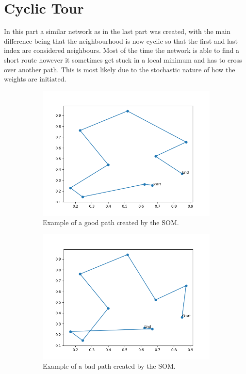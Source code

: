 \documentclass{article}
\begin{document}
\section{Cyclic Tour}
In this part  a similar network as in the last part was created, with the main difference being that the neighbourhood is now cyclic so that the first and last index are considered neighbours. Most of the time the network is able to find a short route however it sometimes get stuck in a local minimum and has to cross over another path. This is most likely due to the stochastic nature of how the weights are initiated.

\begin{figure}[ht!]
    \centering
    \begin{subfigure}[t]{0.4\textwidth}
        \centering
        \includegraphics[width=1\textwidth]{plots/assignment_2/cities_good_solution_20_epochs.png}
        \caption{Example of a good path created by the SOM.}
    \end{subfigure}
    \begin{subfigure}[t]{0.4\textwidth}
        \centering
        \includegraphics[width=1\textwidth]{plots/assignment_2/cities_bad_solution_20_epochs.png}
        \caption{Example of a bad path created by the SOM.}
    \end{subfigure}
    \caption{}
\end{figure}
\end{document}
